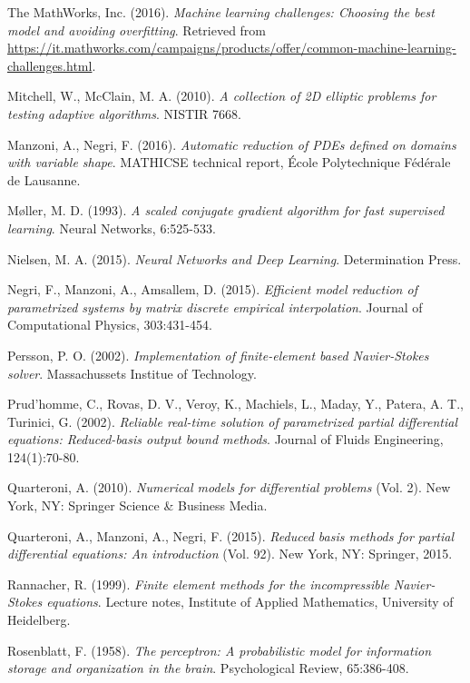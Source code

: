 \documentclass[longtitle]{elsarticle}
\numberwithin{equation}{section}
\theoremstyle{theorem}
\theoremstyle{definition}
\theoremstyle{remark}
\theoremstyle{proposition}
\numberwithin{figure}{section}
\begin{document}
\begin{thebibliography}{50}
		The MathWorks, Inc. (2016). \emph{Machine learning challenges: Choosing the best model and avoiding overfitting}. Retrieved from \url{https://it.mathworks.com/campaigns/products/offer/common-machine-learning-challenges.html}.
		
		Mitchell, W., McClain, M. A. (2010). \emph{A collection of 2D elliptic problems for testing adaptive algorithms}. NISTIR 7668.
		
		Manzoni, A., Negri, F. (2016). \emph{Automatic reduction of PDEs defined on domains with variable shape}. MATHICSE technical report, \'Ecole Polytechnique F\'ed\'erale de Lausanne.
		
		M\o{}ller, M. D. (1993). \emph{A scaled conjugate gradient algorithm for fast supervised learning}. Neural Networks, 6:525-533.

		Nielsen, M. A. (2015). \emph{Neural Networks and Deep Learning}. Determination Press.
				
		Negri, F., Manzoni, A., Amsallem, D. (2015). \emph{Efficient model reduction of parametrized systems by matrix discrete empirical interpolation}. Journal of Computational Physics, 303:431-454.
		
		Persson, P. O. (2002). \emph{Implementation of finite-element based Navier-Stokes solver}. Massachussets Institue of Technology.
		
		Prud'homme, C., Rovas, D. V., Veroy, K., Machiels, L., Maday, Y., Patera, A. T., Turinici, G. (2002). \emph{Reliable real-time solution of parametrized partial differential equations: Reduced-basis output bound methods}. Journal of Fluids Engineering, 124(1):70-80.
		
		Quarteroni, A. (2010). \emph{Numerical models for differential problems} (Vol. 2). New York, NY: Springer Science \& Business Media.
		
		Quarteroni, A., Manzoni, A., Negri, F. (2015). \emph{Reduced basis methods for partial differential equations: An introduction} (Vol. 92). New York, NY: Springer, 2015.
		
		Rannacher, R. (1999). \emph{Finite element methods for the incompressible Navier-Stokes equations}. Lecture notes, Institute of Applied Mathematics, University of Heidelberg.
		
		Rosenblatt, F. (1958). \emph{The perceptron: A probabilistic model for information storage and organization in the brain}. Psychological Review, 65:386-408.
		

\end{thebibliography}
\end{document}
